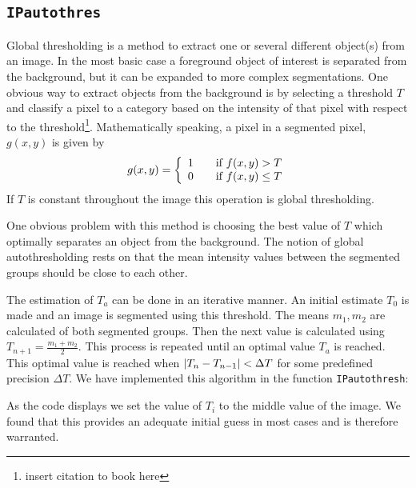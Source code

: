 \subsection{\texttt{IPautothres}}
Global thresholding is a method to extract one or several different object(s) from an image. 
In the most basic case a foreground object of interest is separated from the background, but it can be expanded to more complex segmentations. 
One obvious way to extract objects from the background is by selecting a threshold \(T\) and classify a pixel to a category based on the intensity of that pixel with respect to the threshold\footnote{insert citation to book here}. 
Mathematically speaking, a pixel in a segmented pixel, \(g(x, y)\) is given by 
\[ 
  g(x,y) = \left\{ 
  \begin{array}{l l}
    1 & \quad \text{if \(f(x, y) > T\)}\\
    0 & \quad \text{if \(f(x, y) \leq T\)}
  \end{array} \right.
\]
If \(T\) is constant throughout the image this operation is global thresholding.

One obvious problem with this method is choosing the best value of \(T\) which optimally separates an object from the background. 
The notion of global autothresholding rests on that the mean intensity values between the segmented groups should be close to each other.

The estimation of \(T_a\) can be done in an iterative manner. 
An initial estimate \(T_0\) is made and an image is segmented using this threshold. 
The means \(m_1, m_2\) are calculated of both segmented groups.
Then the next value is calculated using \(T_{n+1} = \frac{m_1 + m_2}{2}\).
This process is repeated until an optimal value \(T_a\) is reached. 
This optimal value is reached when \(\lvert T_n - T_{n - 1}\rvert < \Delta T\) for some predefined precision \(\Delta T\).
\clearpage
We have implemented this algorithm in the function \texttt{IPautothresh}:

As the code displays we set the value of \(T_i\) to the middle value of the image. 
We found that this provides an adequate initial guess in most cases and is therefore warranted. 

